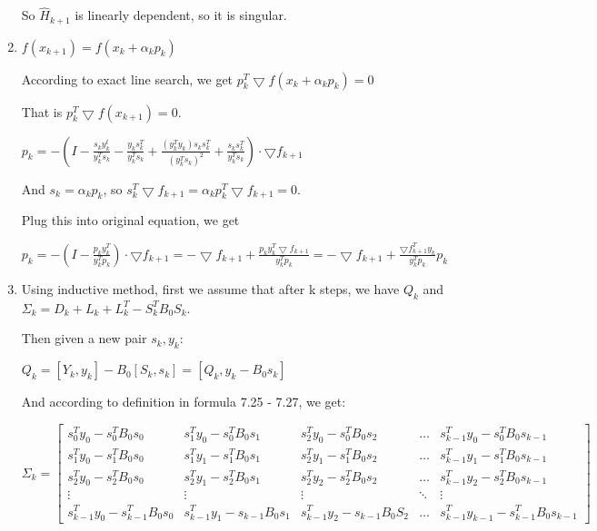 \documentclass[12pt]{article}
\begin{document}
\begin{enumerate}
So $\hat H_{k+1}$ is linearly dependent, so it is singular.




\bigskip
\bigskip
\bigskip





\item

$f(x_{k+1}) = f(x_k + \alpha_k p_k)$

According to exact line search, we get $ p_k^T  \bigtriangledown f(x_k + \alpha_k p_k) = 0$

That is $p_k^T  \bigtriangledown f(x_{k+1}) = 0$.

$ p_k = - ( I - \frac{s_ky_k^t}{y_k^Ts_k} - \frac{y_ks_k^T}{y_k^Ts_k} + \frac{(y_k^Ty_k)s_ks_k^T}{(y_k^Ts_k)^2} + \frac{s_ks_k^T}{y_k^Ts_k}) \cdot \bigtriangledown f_{k+1}$

And $s_k = \alpha_k p_k$, so $s_k^T \bigtriangledown f_{k+1} = \alpha_k p_k^T \bigtriangledown f_{k+1} = 0$.

Plug this into original equation, we get

$ p_k = - ( I - \frac{p_ky_k^T}{y_k^Tp_k} ) \cdot \bigtriangledown f_{k+1} = -\bigtriangledown f_{k+1} + \frac{p_ky_k^T \bigtriangledown f_{k+1}}{y_k^T p_k} =  -\bigtriangledown f_{k+1} + \frac{\bigtriangledown f_{k+1}^T y_k}{y_k^T p_k} p_k $



\bigskip
\bigskip
\bigskip





\item

Using inductive method, first we assume that after k steps, we have $Q_k$ and $\Sigma_k = D_k + L_k + L_k^T - S_k^T B_0 S_k$.

Then given a new pair $s_k, y_k$:

$Q_k = [Y_k, y_k] - B_0 [S_k, s_k] = [Q_k, y_k - B_0 s_k]$

And according to definition in formula 7.25 - 7.27, we get:

$\Sigma_k =
\begin{bmatrix}
s_0^T y_0 - s_0^T B_0 s_0 & s_1^T y_0 - s_0^T B_0 s_1 & s_2^T y_0 - s_0^T B_0 s_2 & \hdots & s_{k-1}^T y_0 - s_0^T B_0 s_{k-1} \\
s_1^T y_0 - s_1^T B_0 s_0 & s_1^T y_1 - s_1^T B_0 s_1 & s_2^T y_1 - s_1^T B_0 s_2 & \hdots & s_{k-1}^T y_1 - s_1^T B_0 s_{k-1} \\
s_2^T y_0 - s_2^T B_0 s_0 & s_2^T y_1 - s_2^T B_0 s_1 & s_2^T y_2 - s_2^T B_0 s_2 & \hdots & s_{k-1}^T y_2 - s_2^T B_0 s_{k-1} \\
\vdots & \vdots & \vdots & \ddots & \vdots\\
s_{k-1}^T y_0 - s_{k-1}^T B_0 s_0 & s_{k-1}^T y_1 - s_{k-1} B_0 s_1 & s_{k-1}^T y_2 - s_{k-1} B_0 S_2 & \hdots & s_{k-1}^T y_{k-1} - s_{k-1}^T B_0 s_{k-1}
\end{bmatrix}$


\end{enumerate}
\end{document}

